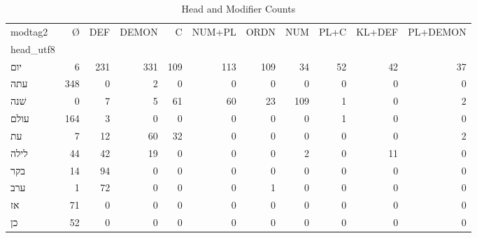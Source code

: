 \begin{table}[htbp!]
\centering
\caption{Head and Modifier Counts}
\label{table:head_modi_ct}
\begin{tabular}{lrrrrrrrrrr}
\toprule
modtag2 &    Ø &  DEF &  DEMON &    C &  NUM+PL &  ORDN &  NUM &  PL+C &  KL+DEF &  PL+DEMON \\
head\_utf8 &      &      &        &      &         &       &      &       &         &           \\
\midrule
יום       &    6 &  231 &    331 &  109 &     113 &   109 &   34 &    52 &      42 &        37 \\
עתה       &  348 &    0 &      2 &    0 &       0 &     0 &    0 &     0 &       0 &         0 \\
שׁנה      &    0 &    7 &      5 &   61 &      60 &    23 &  109 &     1 &       0 &         2 \\
עולם      &  164 &    3 &      0 &    0 &       0 &     0 &    0 &     1 &       0 &         0 \\
עת        &    7 &   12 &     60 &   32 &       0 &     0 &    0 &     0 &       0 &         2 \\
לילה      &   44 &   42 &     19 &    0 &       0 &     0 &    2 &     0 &      11 &         0 \\
בקר       &   14 &   94 &      0 &    0 &       0 &     0 &    0 &     0 &       0 &         0 \\
ערב       &    1 &   72 &      0 &    0 &       0 &     1 &    0 &     0 &       0 &         0 \\
אז        &   71 &    0 &      0 &    0 &       0 &     0 &    0 &     0 &       0 &         0 \\
כן        &   52 &    0 &      0 &    0 &       0 &     0 &    0 &     0 &       0 &         0 \\
\bottomrule
\end{tabular}
\end{table}
